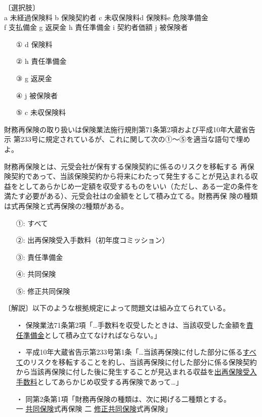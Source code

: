\documentclass[report,gutter=10mm,fore-edge=10mm,uplatex,dvipdfmx]{jlreq}
\begin{document}
〔選択肢〕\\
a 未経過保険料 b 保険契約者 c 未収保険料d 保険料e 危険準備金\\
f 支払備金 g 返戻金 h 責任準備金 i 契約者価額 j 被保険者
\answer{}

\begin{itemize}
\item[ ① ] d 保険料
\item[ ② ] h 責任準備金
\item[ ③ ] g 返戻金
\item[ ④ ]  j 被保険者
\item[ ⑤ ] c 未収保険料
\end{itemize}

財務再保険の取り扱いは保険業法施行規則第71条第2項および平成10年大蔵省告示
第233号に規定されているが、これに関して次の①〜⑤を適当な語句で埋めよ。

財務再保険とは、元受会社が保有する保険契約に係るのリスクを移転する
再保険契約であって、当該保険契約から将来にわたって発生することが見込まれる収
益をとしてあらかじめ一定額を収受するものをいい（ただし、ある一定の条件を
満たす必要がある）、元受会社はの金額をとして積み立てる。財務再保
険の種類は式再保険と式再保険の2種類がある。

\answer{}
\begin{itemize}
\item[ ①: ] すべて
\item[ ②: ] 出再保険受入手数料（初年度コミッション）
\item[ ③: ] 責任準備金
\item[ ④: ] 共同保険
\item[ ⑤: ] 修正共同保険
\end{itemize}

〔解説〕以下のような根拠規定によって問題文は組み立てられている。
\begin{itemize}
\item[ ・]  保険業法71条第2項「…手数料を収受したときは、当該収受した金額を\underline{責任準備金}として積み立てなければならない。」
\item[ ・]  平成10年大蔵省告示第233号第1条「…当該再保険に付した部分に係る\underline{すべて}のリスクを移転することを約し、当該再保険に付した部分に係る保険契約から当該再保険に付した後に発生することが見込まれる収益を\underline{出再保険受入手数料}としてあらかじめ収受する再保険であって…」
\item[ ・]  同第2条第1項「財務再保険の種類は、次に掲げる二種類とする。\\
 一 \underline{共同保険}式再保険 二 \underline{修正共同保険}式再保険」
\end{itemize}
\end{document}
